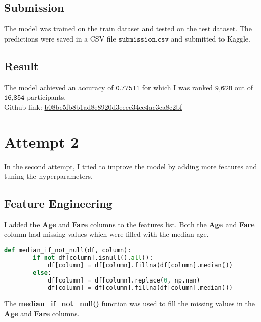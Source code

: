 \documentclass{exam}
\begin{document}
\begin{questions}
\begin{TheSolution}
        \subsection{Submission}

        The model was trained on the train dataset and tested on the test dataset. The predictions were saved in a CSV file $\texttt{submission.csv}$ and submitted to Kaggle.

        \subsection{Result}

        The model achieved an accuracy of $\texttt{0.77511}$ for which I was ranked $\texttt{9,628}$ out of $\texttt{16,854}$ participants. \\

        Github link: \href{https://github.com/achyutkneupane/KaggleTitanic/tree/b08be5fb8b1ad8e8920d3eeee34cc4ac3ca8c2bf}{b08be5fb8b1ad8e8920d3eeee34cc4ac3ca8c2bf}

        \newpage

        \section{Attempt 2}

        In the second attempt, I tried to improve the model by adding more features and tuning the hyperparameters.

        \subsection{Feature Engineering}

        I added the \textbf{Age} and \textbf{Fare} columns to the features list. Both the \textbf{Age} and \textbf{Fare} column had missing values which were filled with the median age.

        \begin{lstlisting}[language=Python]
    def median_if_not_null(df, column):
        if not df[column].isnull().all():
            df[column] = df[column].fillna(df[column].median())
        else:
            df[column] = df[column].replace(0, np.nan)
            df[column] = df[column].fillna(df[column].median())
        \end{lstlisting}

        The \textbf{median\_if\_not\_null()} function was used to fill the missing values in the \textbf{Age} and \textbf{Fare} columns.


\end{TheSolution}
\end{questions}
\end{document}

